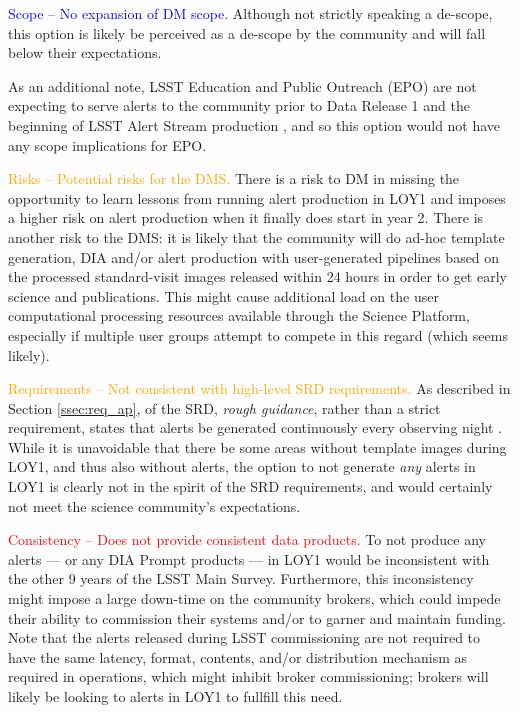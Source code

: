 \documentclass[DM,lsstdraft,toc]{lsstdoc}
\begin{document}
\textcolor{blue}{ Scope -- No expansion of DM scope.} 
Although not strictly speaking a de-scope, this option is likely be perceived as a de-scope by the community and will fall below their expectations. 

As an additional note, LSST Education and Public Outreach (EPO) are not expecting to serve alerts to the community prior to Data Release 1 and the beginning of LSST Alert Stream production , and so this option would not have any scope implications for EPO. 

\textcolor{orange}{ Risks -- Potential risks for the DMS.}
There is a risk to DM in missing the opportunity to learn lessons from running alert production in LOY1
and imposes a higher risk on alert production when it finally does start in year 2.
There is another risk to the DMS: it is likely that the community will do ad-hoc template generation, DIA and/or alert production with user-generated pipelines based on the processed standard-visit images released within 24 hours in order to get early science and publications.
This might cause additional load on the user computational processing resources available through the Science Platform, especially if multiple user groups attempt to compete in this regard (which seems likely).

\textcolor{orange}{ Requirements -- Not consistent with high-level SRD requirements.}
As described in Section \ref{ssec:req_ap}, of the SRD,  {\it rough guidance}, rather than a strict requirement,  states that alerts be generated continuously every observing night . 
While it is unavoidable that there be some areas without template images during LOY1, and thus also without alerts, the option to not generate {\it any} alerts in LOY1 is clearly not in the spirit of the SRD requirements, and would certainly not meet the science community's expectations. 

\textcolor{red}{ Consistency -- Does not provide consistent data products.}
To not produce any alerts --- or any DIA Prompt products --- in LOY1 would be inconsistent with the other 9 years of the LSST Main Survey.
Furthermore, this inconsistency might impose a large down-time on the community brokers, which could impede their ability to commission their systems and/or to garner and maintain funding.
Note that the alerts released during LSST commissioning are not required to have the same latency, format, contents, and/or distribution mechanism as required in operations, which might inhibit broker commissioning;  brokers will likely be looking to alerts in LOY1 to fullfill this need.
\end{document}
